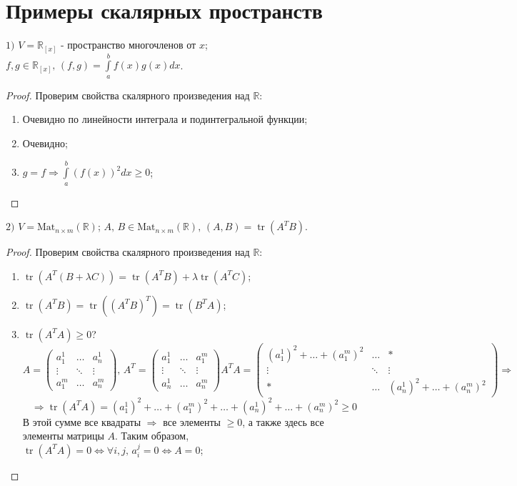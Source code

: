 \documentclass[12pt]{article}
\newcommand{\MR}{\mathbb{R}}
\newcommand{\Mat}{\text{Mat}}
\theoremstyle{definition}
\DeclareMathOperator{\tr}{tr}
\newcommand{\ddint}[2]{\displaystyle\int\limits_{#1}^{#2}}
\begin{document}
\section*{Примеры скалярных пространств}
$1)$ $V = \MR_{[x]}$ - пространство многочленов от $x$; $f,g \in \MR_{[x]}, \, (f,g) = \ddint{a}{b}f(x)g(x)dx$. 
\begin{proof}
	Проверим свойства скалярного произведения над $\MR$:
	\begin{enumerate}[label ={(\arabic*)}]
		\item Очевидно по линейности интеграла и подинтегральной функции; 
		\item Очевидно;
		\item $g = f \Rightarrow \ddint{a}{b}(f(x))^2dx \geq 0$;
	\end{enumerate}
\end{proof}

$2)$ $V = \Mat_{n \times m}(\MR)$; $A,\, B \in \Mat_{n \times m}(\MR), \, (A,B) = \tr(A^TB)$.
\begin{proof}
	Проверим свойства скалярного произведения над $\MR$:
	\begin{enumerate}[label ={(\arabic*)}]
		\item $\tr(A^T(B + \lambda C)) = \tr(A^TB) + \lambda\tr(A^TC)$;
		\item $\tr(A^TB) = \tr((A^TB)^T) = \tr(B^TA)$;
		\item $\tr(A^TA) \geq 0$?
		$$
			A = 
			\begin{pmatrix}
				a_1^1 & \dotsc & a_n^1\\
				\vdots & \ddots & \vdots \\
				a_1^m & \dotsc & a_n^m
			\end{pmatrix}, \, 
			A^T = 
			\begin{pmatrix}
				a_1^1 & \dotsc & a_1^m\\
				\vdots & \ddots & \vdots \\
				a_n^1 & \dotsc & a_n^m
			\end{pmatrix} 
			A^TA = 
			\begin{pmatrix}
				(a_1^1)^2 + \dotsc + (a_1^m)^2 &  \dotsc & * \\
				\vdots & \ddots & \vdots \\
				* & \dotsc & (a_n^1)^2 + \dotsc + (a_n^m)^2 
			\end{pmatrix} \Rightarrow
		$$
		$$
			\Rightarrow \tr{(A^TA)} = (a_1^1)^2 + \dotsc + (a_1^m)^2 + \dotsc + (a_n^1)^2 + \dotsc + (a_n^m)^2 \geq 0
		$$
		В этой сумме все квадраты $\Rightarrow$ все элементы $\geq 0$, а также здесь все элементы матрицы $A$. Таким образом, $\tr{(A^TA)} = 0 \Leftrightarrow \forall i,j, \, a_i^j = 0 \Leftrightarrow A =0$;
	\end{enumerate}
\end{proof} 
\end{document}
